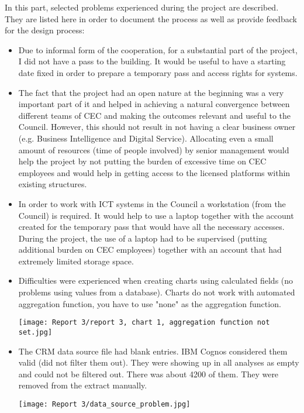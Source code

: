 In this part, selected problems experienced during the project are described. They are listed here in order to document the process as well as provide feedback for the design process:
\begin{itemize}
\item Due to informal form of the cooperation, for a substantial part of the project, I did not have a pass to the building. It would be useful to have a starting date fixed in order to prepare a temporary pass and access rights for systems.
\item The fact that the project had an open nature at the beginning was a very important part of it and helped in achieving a natural convergence between different teams of CEC and making the outcomes relevant and useful to the Council. However, this should not result in not having a clear business owner (e.g. Business Intelligence and Digital Service). Allocating even a small amount of resources (time of people involved) by senior management would help the project by not putting the burden of excessive time on CEC employees and would help in getting access to the licensed platforms within existing structures.
\item In order to work with ICT systems in the Council a workstation (from the Council) is required. It would help to use a laptop together with the account created for the temporary pass that would have all the necessary accesses. During the project, the use of a laptop had to be supervised (putting additional burden on CEC employees) together with an account that had extremely limited storage space.
\item Difficulties were experienced when creating charts using calculated fields (no problems using values from a database). Charts do not work with automated aggregation function, you have to use "none" as the aggregation function.
\begin{center}
  \texttt{[image: Report 3/report 3, chart 1, aggregation function not set.jpg]}
  \label{normal_case}
\end{center}
\item The CRM data source file had blank entries. IBM Cognos considered them valid (did not filter them out). They were showing up in all analyses as empty and could not be filtered out. There was about 4200 of them. They were removed from the extract manually.
\begin{center}
  \texttt{[image: Report 3/data\_source\_problem.jpg]}

\end{center}
\end{itemize}
